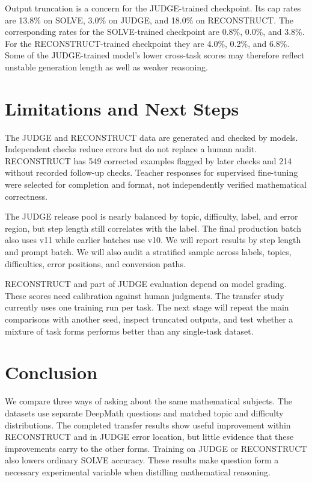 \documentclass[11pt]{article}
\begin{document}
Output truncation is a concern for the JUDGE-trained checkpoint. Its cap rates are 13.8\% on SOLVE, 3.0\% on JUDGE, and 18.0\% on RECONSTRUCT. The corresponding rates for the SOLVE-trained checkpoint are 0.8\%, 0.0\%, and 3.8\%. For the RECONSTRUCT-trained checkpoint they are 4.0\%, 0.2\%, and 6.8\%. Some of the JUDGE-trained model's lower cross-task scores may therefore reflect unstable generation length as well as weaker reasoning.

\section{Limitations and Next Steps}

The JUDGE and RECONSTRUCT data are generated and checked by models. Independent checks reduce errors but do not replace a human audit. RECONSTRUCT has 549 corrected examples flagged by later checks and 214 without recorded follow-up checks. Teacher responses for supervised fine-tuning were selected for completion and format, not independently verified mathematical correctness.

The JUDGE release pool is nearly balanced by topic, difficulty, label, and error region, but step length still correlates with the label. The final production batch also uses v11 while earlier batches use v10. We will report results by step length and prompt batch. We will also audit a stratified sample across labels, topics, difficulties, error positions, and conversion paths.

RECONSTRUCT and part of JUDGE evaluation depend on model grading. These scores need calibration against human judgments. The transfer study currently uses one training run per task. The next stage will repeat the main comparisons with another seed, inspect truncated outputs, and test whether a mixture of task forms performs better than any single-task dataset.

\section{Conclusion}

We compare three ways of asking about the same mathematical subjects. The datasets use separate DeepMath questions and matched topic and difficulty distributions. The completed transfer results show useful improvement within RECONSTRUCT and in JUDGE error location, but little evidence that these improvements carry to the other forms. Training on JUDGE or RECONSTRUCT also lowers ordinary SOLVE accuracy. These results make question form a necessary experimental variable when distilling mathematical reasoning.
\end{document}
